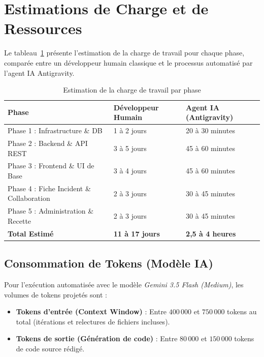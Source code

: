 \documentclass[12pt,a4paper]{article}
\begin{document}
\section{Estimations de Charge et de Ressources}
Le tableau~\ref{tab:estimations} présente l'estimation de la charge de travail pour chaque phase, comparée entre un développeur humain classique et le processus automatisé par l'agent IA Antigravity.

\begin{table}[htbp]
    \centering
    \caption{Estimation de la charge de travail par phase}
    \label{tab:estimations}
    \vspace{0.3cm}
    \begin{tabular}{lll}
        \toprule
        \textbf{Phase} & \textbf{Développeur Humain} & \textbf{Agent IA (Antigravity)} \\
        \midrule
        Phase 1 : Infrastructure \& DB & 1 à 2 jours & 20 à 30 minutes \\
        Phase 2 : Backend \& API REST & 3 à 5 jours & 45 à 60 minutes \\
        Phase 3 : Frontend \& UI de Base & 3 à 4 jours & 45 à 60 minutes \\
        Phase 4 : Fiche Incident \& Collaboration & 2 à 3 jours & 30 à 45 minutes \\
        Phase 5 : Administration \& Recette & 2 à 3 jours & 30 à 45 minutes \\
        \midrule
        \textbf{Total Estimé} & \textbf{11 à 17 jours} & \textbf{2,5 à 4 heures} \\
        \bottomrule
    \end{tabular}
\end{table}

\subsection{Consommation de Tokens (Modèle IA)}
Pour l'exécution automatisée avec le modèle \textit{Gemini 3.5 Flash (Medium)}, les volumes de tokens projetés sont :
\begin{itemize}
    \item \textbf{Tokens d'entrée (Context Window)} : Entre $400\,000$ et $750\,000$ tokens au total (itérations et relectures de fichiers incluses).
    \item \textbf{Tokens de sortie (Génération de code)} : Entre $80\,000$ et $150\,000$ tokens de code source rédigé.
\end{itemize}
\end{document}
